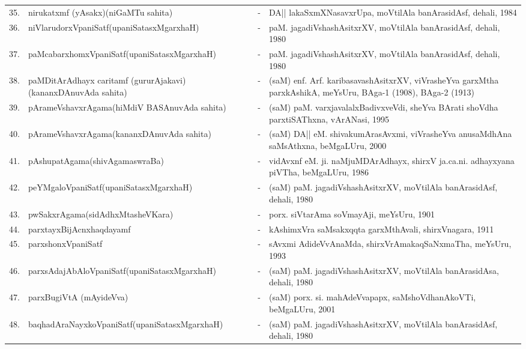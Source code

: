 {\begin{longtable}{rp{6cm}cp{9cm}<{\raggedright}}
35. & nirukatxmf (yAsakx)\newline (niGaMTu sahita) &-& DA|| lakaSxmXNasavxrUpa, moVtilAla banArasidAsf, dehali, 1984\\
36. & niVlarudorxVpaniSatf\newline (upaniSatasxMgarxhaH) &-& paM. jagadiVshashAsitxrXV, moVtilAla banArasidAsf, dehali, 1980\\
37. & paMcabarxhomxVpaniSatf\newline (upaniSatasxMgarxhaH) &-& paM. jagadiVshashAsitxrXV, moVtilAla banArasidAsf, dehali, 1980\\
38. & paMDitArAdhayx caritamf (gururAjakavi)\newline (kananxDAnuvAda sahita) &-& (saM) enf. Arf. karibasavashAsitxrXV, viVrasheYva garxMtha parxkAshikA, meYsUru, BAga-1 (1908), BAga-2 (1913)\\
39. & pArameVshavxrAgama\newline (hiMdiV BASAnuvAda sahita) &-& (saM) paM. varxjavalalxBadivxveVdi, sheYva BArati shoVdha parxtiSAThxna, vArANasi, 1995\\
40. & pArameVshavxrAgama\newline (kananxDAnuvAda sahita) &-& (saM) DA|| eM. shivakumArasAvxmi, viVrasheYva anusaMdhAna saMsAthxna, beMgaLUru, 2000\\
41. & pAshupatAgama\newline (shivAgamaswraBa) &-& vidAvxnf eM. ji. naMjuMDArAdhayx, shirxV ja.ca.ni. adhayxyana piVTha, beMgaLUru, 1986\\
42. & peYMgaloVpaniSatf\newline (upaniSatasxMgarxhaH) &-& (saM) paM. jagadiVshashAsitxrXV, moVtilAla banArasidAsf, dehali, 1980\\
43. & pwSakxrAgama\newline (sidAdhxMtasheVKara) &-& porx. siVtarAma soVmayAji, meYsUru, 1901\\
44. & parxtayxBijAcnxhaqdayamf &-& kAshimxVra saMsakxqqta garxMthAvali, shirxVnagara, 1911\\
45. & parxshonxVpaniSatf &-& sAvxmi AdideVvAnaMda, shirxVrAmakaqSaNxmaTha, meYsUru, 1993\\
46. & parxsAdajAbAloVpaniSatf\newline (upaniSatasxMgarxhaH) &-& (saM) paM. jagadiVshashAsitxrXV, moVtilAla banArasidAsa, dehali, 1980\\
47. & parxBugiVtA (mAyideVva) &-& (saM) porx. si. mahAdeVvapapx, saMshoVdhanAkoVTi, beMgaLUru, 2001\\
48. & baqhadAraNayxkoVpaniSatf\newline (upaniSatasxMgarxhaH) &-& (saM) paM. jagadiVshashAsitxrXV, moVtilAla banArasidAsf, dehali, 1980\\

\end{longtable}}
